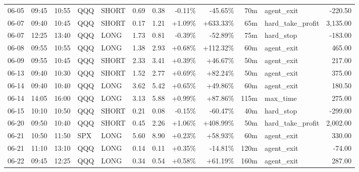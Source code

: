 \documentclass[11pt,a4paper,twoside]{article}
\begin{document}
\begin{center}
\begin{longtable}{>{\color{txtmain}}l l l l l r r r r r >{\color{txtmain}}l r}
06-05 & 09:45 & 10:55 & QQQ & SHORT & 0.69 & 0.38 & \textcolor{lossred}{-0.11\%} & \textcolor{lossred}{-45.65\%} & 70m & agent\_exit & \textcolor{lossred}{-220.50} \\
06-07 & 09:40 & 10:45 & QQQ & SHORT & 0.17 & 1.21 & \textcolor{wingreen}{+1.09\%} & \textcolor{wingreen}{+633.33\%} & 65m & hard\_take\_profit & \textcolor{wingreen}{3,135.00} \\
06-07 & 12:25 & 13:40 & QQQ & LONG & 1.73 & 0.81 & \textcolor{lossred}{-0.39\%} & \textcolor{lossred}{-52.89\%} & 75m & hard\_stop & \textcolor{lossred}{-183.00} \\
06-08 & 09:55 & 10:55 & QQQ & LONG & 1.38 & 2.93 & \textcolor{wingreen}{+0.68\%} & \textcolor{wingreen}{+112.32\%} & 60m & agent\_exit & \textcolor{wingreen}{465.00} \\
06-09 & 09:55 & 10:45 & QQQ & SHORT & 2.33 & 3.41 & \textcolor{wingreen}{+0.39\%} & \textcolor{wingreen}{+46.67\%} & 50m & agent\_exit & \textcolor{wingreen}{217.00} \\
06-13 & 09:40 & 10:30 & QQQ & SHORT & 1.52 & 2.77 & \textcolor{wingreen}{+0.69\%} & \textcolor{wingreen}{+82.24\%} & 50m & agent\_exit & \textcolor{wingreen}{375.00} \\
06-14 & 09:40 & 10:40 & QQQ & LONG & 3.62 & 5.42 & \textcolor{wingreen}{+0.65\%} & \textcolor{wingreen}{+49.86\%} & 60m & agent\_exit & \textcolor{wingreen}{180.50} \\
06-14 & 14:05 & 16:00 & QQQ & LONG & 3.13 & 5.88 & \textcolor{wingreen}{+0.99\%} & \textcolor{wingreen}{+87.86\%} & 115m & max\_time & \textcolor{wingreen}{275.00} \\
06-15 & 10:10 & 10:50 & QQQ & SHORT & 0.21 & 0.08 & \textcolor{lossred}{-0.15\%} & \textcolor{lossred}{-60.47\%} & 40m & hard\_stop & \textcolor{lossred}{-299.00} \\
06-20 & 09:50 & 10:40 & QQQ & SHORT & 0.45 & 2.26 & \textcolor{wingreen}{+1.06\%} & \textcolor{wingreen}{+408.99\%} & 50m & hard\_take\_profit & \textcolor{wingreen}{2,002.00} \\
06-21 & 10:50 & 11:50 & SPX & LONG & 5.60 & 8.90 & \textcolor{wingreen}{+0.23\%} & \textcolor{wingreen}{+58.93\%} & 60m & agent\_exit & \textcolor{wingreen}{330.00} \\
06-21 & 11:10 & 13:10 & QQQ & LONG & 0.14 & 0.11 & \textcolor{wingreen}{+0.35\%} & \textcolor{lossred}{-14.81\%} & 120m & agent\_exit & \textcolor{lossred}{-74.00} \\
06-22 & 09:45 & 12:25 & QQQ & LONG & 0.34 & 0.54 & \textcolor{wingreen}{+0.58\%} & \textcolor{wingreen}{+61.19\%} & 160m & agent\_exit & \textcolor{wingreen}{287.00} \\

\end{longtable}
\end{center}
\end{document}
